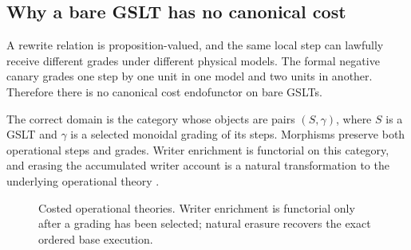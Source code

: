 \documentclass[11pt]{article}
\theoremstyle{remark}
\begin{document}
\subsection{Why a bare GSLT has no canonical cost}

A rewrite relation is proposition-valued, and the same local step can
lawfully receive different grades under different physical models.  The
formal negative canary grades one step by one unit in one model and two units
in another.  Therefore there is no canonical cost endofunctor on bare GSLTs.

The correct domain is the category whose objects are pairs
\((S,\gamma)\), where \(S\) is a GSLT and \(\gamma\) is a selected monoidal
grading of its steps.  Morphisms preserve both operational steps and grades.
Writer enrichment is functorial on this category, and erasing the accumulated
writer account is a natural transformation to the underlying operational
theory \cite{moggi}.

\begin{figure}[htbp]
\centering
{}
\caption{Costed operational theories.  Writer enrichment is functorial only
after a grading has been selected; natural erasure recovers the exact ordered
base execution.}
\label{fig:costed-category}
\end{figure}
\end{document}
